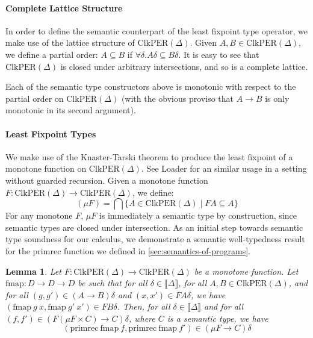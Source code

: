 \documentclass[natbib]{sigplanconf}
\newcommand{\sepbar}{\mathrel|}
\newcommand{\sem}[1]{\llbracket #1 \rrbracket}
\newcommand{\ClkPER}{\mathrm{ClkPER}}
\newtheorem{lemma}{Lemma}
\begin{document}
\paragraph{Complete Lattice Structure} In order to define the semantic
counterpart of the least fixpoint type operator, we make use of the
lattice structure of $\ClkPER(\Delta)$. Given $A, B \in
\ClkPER(\Delta)$, we define a partial order: $A \subseteq B$ if
$\forall \delta. A\delta \subseteq B\delta$. It is easy to see that
$\ClkPER(\Delta)$ is closed under arbitrary intersections, and so is a
complete lattice.

Each of the semantic type constructors above is monotonic with respect
to the partial order on $\ClkPER(\Delta)$ (with the obvious proviso
that $A \to B$ is only monotonic in its second argument).

\paragraph{Least Fixpoint Types}
We make use of the Knaster-Tarski theorem \cite{tarski55lattice} to
produce the least fixpoint of a monotone function on
$\ClkPER(\Delta)$. See Loader \cite{loader97equational} for an similar
usage in a setting without guarded recursion. Given a monotone
function $F : \ClkPER(\Delta) \to \ClkPER(\Delta)$, we define:
\begin{displaymath}
  (\mu F) = \bigcap \{ A \in \ClkPER(\Delta) \sepbar FA \subseteq A \}
\end{displaymath}
For any monotone $F$, $\mu F$ is immediately a semantic type by
construction, since semantic types are closed under intersection. As
an initial step towards semantic type soundness for our calculus, we
demonstrate a semantic well-typedness result for the
$\mathrm{primrec}$ function we defined in
\autoref{sec:semantics-of-programs}.

\begin{lemma}\label{lem:primrec-well-typed}
  Let $F : \ClkPER(\Delta) \to \ClkPER(\Delta)$ be a monotone
  function.  Let $\mathrm{fmap} : D \to D \to D$ be such that for all
  $\delta \in \sem{\Delta}$, for all $A,B \in \ClkPER(\Delta)$, and
  for all $(g,g') \in (A \to B)\delta$ and $(x,x') \in FA\delta$, we
  have $(\mathrm{fmap}\ g\ x, \mathrm{fmap}\ g'\ x') \in FB\delta$.
  Then, for all $\delta \in \sem{\Delta}$ and for all $(f,f') \in
  (F(\mu F \times C) \to C)\delta$, where $C$ is a semantic type, we
  have
  \begin{displaymath}
    (\mathrm{primrec}\ \mathrm{fmap}\ f, \mathrm{primrec}\ \mathrm{fmap}\ f') \in (\mu F \to C)\delta
  \end{displaymath}
\end{lemma}
\end{document}
